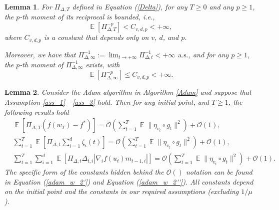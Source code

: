 \documentclass{article} %
\newtheorem{lemma}{Lemma}[section]
\DeclareMathOperator{\Expect}{\mathbb{E}}
\begin{document}
\begin{lemma}\label{bounded_moment}
For $\Pi_{\Delta,T}$ defined in Equation (\ref{Delta}), for any $T \geq 0$ and any $p \geq 1$, the $p$-th moment of its reciprocal is bounded, i.e.,
\[\Expect\left[\Pi^{-p}_{\Delta,T}\right] < C_{v,d,p} < +\infty,\]
where $C_{v,d,p}$ is a constant that depends only on $v$, $d$, and $p$.

Moreover, we have that $\Pi^{-1}_{\Delta,\infty} := \lim_{t \rightarrow +\infty} \Pi^{-1}_{\Delta,t} < +\infty \ \ \text{a.s.}$, and for any $p \geq 1$, the $p$-th moment of $\Pi^{-1}_{\Delta,\infty}$ exists, with
\[\Expect\left[\Pi^{-p}_{\Delta,\infty}\right] \leq C_{v,d,p} < +\infty.\]
\end{lemma}
\begin{lemma}\label{lem_sum'}
Consider the Adam algorithm in Algorithm \ref{Adam} and suppose that Assumption \ref{ass_1} - \ref{ass_3} hold. Then for any initial point, and $T \geq 1$, the following results hold
\begin{align*}
&\Expect[\Pi_{\Delta,T}(f(w_{T})-f^*)]=\mathcal{O}\left(\sum_{t=1}^{T}\Expect\|\eta_{v_{t}}\circ g_{t}\|^{2}\right)+\mathcal{O}(1),  
\\&\sum_{t=1}^{T}\Expect\left[\Pi_{\Delta,t}\sum_{i=1}^{d}\zeta_{i}(t)\right]=\mathcal{O}\left(\sum_{t=1}^{T}\Expect\|\eta_{v_{t}}\circ g_{t}\|^{2}\right)+\mathcal{O}(1),
\\&\sum_{t=1}^{T}\sum_{i=1}^{d}\Expect\left[\Pi_{\Delta,t}\Delta_{t,i}|\nabla_{i} f(u_{t})m_{t-1,i}|\right]=\mathcal{O}\left(\sum_{t=1}^{T}\Expect\|\eta_{v_{t}}\circ g_{t}\|^{2}\right)+\mathcal{O}(1).
\end{align*}
The specific form of the constants hidden behind the \(\mathcal{O}()\) notation can be found in Equation (\ref{adam_w_2'}) and Equation (\ref{adam_w_2''}). All constants depend on the initial point and the constants in our required assumptions (excluding $1/\mu$).
\end{lemma}
\end{document}

